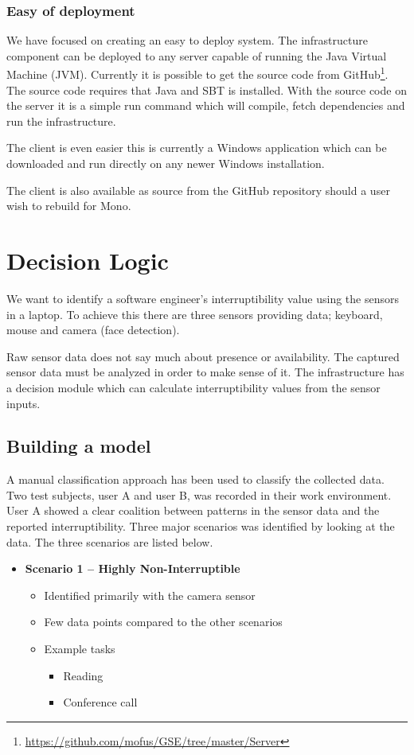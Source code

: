 \documentclass{sigchi}
\begin{document}
\subsubsection{Easy of deployment}
We have focused on creating an easy to deploy system.
The infrastructure component can be deployed to any server capable of running the Java Virtual Machine (JVM).
Currently it is possible to get the source code from GitHub\footnote{\url{https://github.com/mofus/GSE/tree/master/Server}}.
The source code requires that Java and SBT is installed.
With the source code on the server it is a simple run command which will compile, fetch dependencies and run the infrastructure.

The client is even easier this is currently a Windows application which can be downloaded and run directly on any newer Windows installation.

The client is also available as source from the GitHub repository should a user wish to rebuild for Mono.

\section{Decision Logic}
We want to identify a software engineer’s interruptibility value using the sensors in a laptop.
To achieve this there are three sensors providing data; keyboard, mouse and camera (face detection).

Raw sensor data does not say much about presence or availability.
The captured sensor data must be analyzed in order to make sense of it.
The infrastructure has a decision module which can calculate interruptibility values from the sensor inputs.

\subsection{Building a model}
A manual classification approach has been used to classify the collected data.
Two test subjects, user A and user B, was recorded in their work environment.
User A showed a clear coalition between patterns in the sensor data and the reported interruptibility.
Three major scenarios was identified by looking at the data.
The three scenarios are listed below.

\begin{itemize}
  \item \textbf{Scenario 1 – Highly Non-Interruptible}
  \begin{itemize}
    \item Identified primarily with the camera sensor
    \item Few data points compared to the other scenarios
    \item Example tasks
    \begin{itemize}
      \item Reading
      \item Conference call
    \end{itemize}
  \end{itemize}
\end{itemize}
\end{document}
